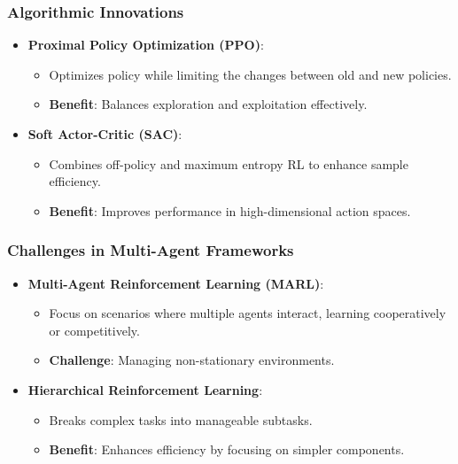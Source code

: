 \documentclass[aspectratio=169]{beamer}
\begin{document}
\begin{frame}
    \frametitle{Algorithmic Innovations}
    \begin{itemize}
        \item \textbf{Proximal Policy Optimization (PPO)}:
        \begin{itemize}
            \item Optimizes policy while limiting the changes between old and new policies.
            \item \textbf{Benefit}: Balances exploration and exploitation effectively.
        \end{itemize}
        
        \item \textbf{Soft Actor-Critic (SAC)}:
        \begin{itemize}
            \item Combines off-policy and maximum entropy RL to enhance sample efficiency.
            \item \textbf{Benefit}: Improves performance in high-dimensional action spaces.
        \end{itemize}
    \end{itemize}
\end{frame}

\begin{frame}
    \frametitle{Challenges in Multi-Agent Frameworks}
    \begin{itemize}
        \item \textbf{Multi-Agent Reinforcement Learning (MARL)}:
        \begin{itemize}
            \item Focus on scenarios where multiple agents interact, learning cooperatively or competitively.
            \item \textbf{Challenge}: Managing non-stationary environments.
        \end{itemize}
        
        \item \textbf{Hierarchical Reinforcement Learning}:
        \begin{itemize}
            \item Breaks complex tasks into manageable subtasks.
            \item \textbf{Benefit}: Enhances efficiency by focusing on simpler components.
        \end{itemize}
    \end{itemize}
\end{frame}
\end{document}
